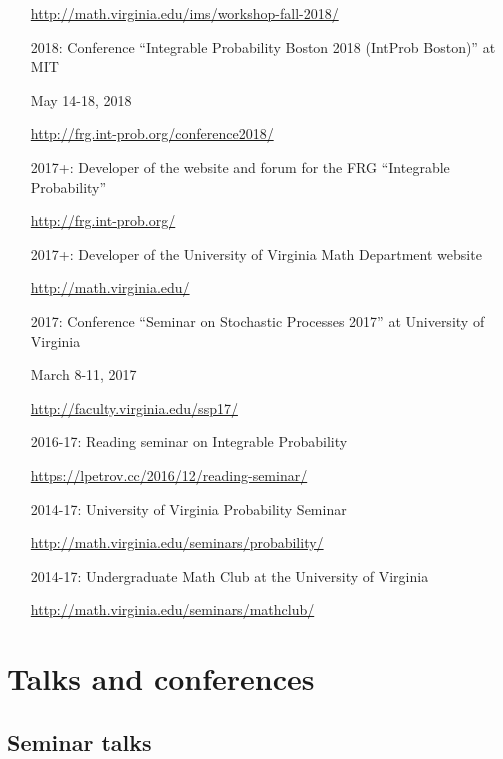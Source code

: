 \documentclass[letterpaper,11pt]{article}
\begin{document}
\begin{itemize}
		\url{http://math.virginia.edu/ims/workshop-fall-2018/}

	\item [2018:]
		Conference 
		``Integrable Probability Boston 2018 (IntProb Boston)''
		at MIT

		May 14-18, 2018
	
		\url{http://frg.int-prob.org/conference2018/}


	\item [2017+:]
		Developer of the website and forum for the FRG ``Integrable Probability''

		\url{http://frg.int-prob.org/}

	\item [2017+:]
		Developer of the University of Virginia Math Department website

		\url{http://math.virginia.edu/}
	\item
	      [2017:] Conference
	      ``Seminar on Stochastic Processes 2017'' at University of
		Virginia
		
		March 8-11, 2017

	      \url{http://faculty.virginia.edu/ssp17/}
	\item
	      [2016-17:]
	      Reading seminar on Integrable Probability

	      \url{https://lpetrov.cc/2016/12/reading-seminar/}
	\item
	      [2014-17:] University of Virginia Probability Seminar

	      \url{http://math.virginia.edu/seminars/probability/}
	\item
	      [2014-17:]
	      Undergraduate Math Club at the University of Virginia

	      \url{http://math.virginia.edu/seminars/mathclub/}
\end{itemize}

\section*{Talks and conferences}

\subsection*{Seminar talks}
\end{document}
